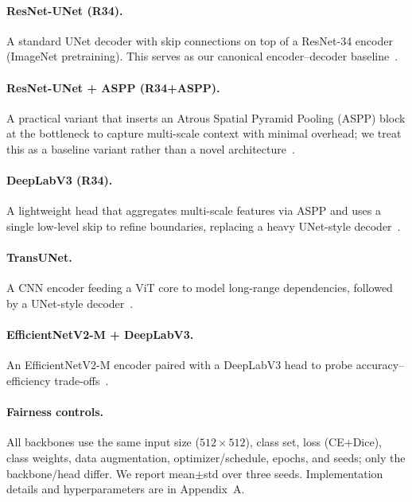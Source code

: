 \documentclass[12pt]{article}
\begin{document}
\paragraph{ResNet-UNet (R34).}
A standard UNet decoder with skip connections on top of a ResNet-34 encoder (ImageNet pretraining). This serves as our canonical encoder–decoder baseline~\cite{ronnebergerUNetConvolutionalNetworks2015a,heDeepResidualLearning2015}.

\paragraph{ResNet-UNet + ASPP (R34+ASPP).}
A practical variant that inserts an Atrous Spatial Pyramid Pooling (ASPP) block at the bottleneck to capture multi-scale context with minimal overhead; we treat this as a baseline variant rather than a novel architecture~\cite{chenDeepLabSemanticImage2017}.

\paragraph{DeepLabV3\textplus{} (R34).}
A lightweight head that aggregates multi-scale features via ASPP and uses a single low-level skip to refine boundaries, replacing a heavy UNet-style decoder~\cite{chenDeepLabSemanticImage2017}.

\paragraph{TransUNet.}
A CNN encoder feeding a ViT core to model long-range dependencies, followed by a UNet-style decoder~\cite{chenTransUNetTransformersMake2021}.

\paragraph{EfficientNetV2-M + DeepLabV3\textplus{}.}
An EfficientNetV2-M encoder paired with a DeepLabV3\textplus{} head to probe accuracy–efficiency trade-offs~\cite{efsongEfficientMarineOil2018,chenDeepLabSemanticImage2017}.

\paragraph{Fairness controls.}
All backbones use the same input size ($512{\times}512$), class set, loss (CE{+}Dice), class weights, data augmentation, optimizer/schedule, epochs, and seeds; only the backbone/head differ. We report mean$\pm$std over three seeds. Implementation details and hyperparameters are in Appendix~A.
\end{document}
